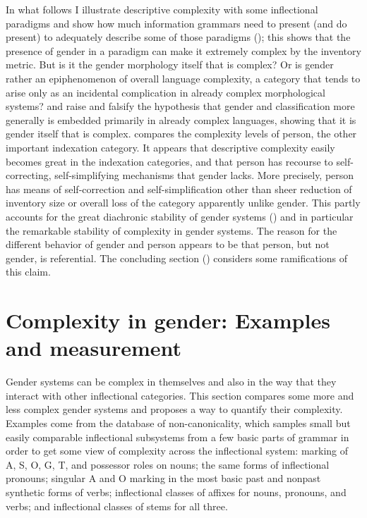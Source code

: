 \documentclass[output=collectionpaper]{langsci/langscibook}
\begin{document}
In what follows I illustrate descriptive complexity with some inflectional para\-digms and show how much information grammars need to present (and do pre\-sent) to adequately describe some of those paradigms (); this shows that the presence of gender in a paradigm can make it extremely complex by the inventory metric. But is it the gender morphology itself that is complex? Or is gender rather an epiphenomenon of overall language complexity, a category that tends to arise only as an incidental complication in already complex morphological systems?  and  raise and falsify the hypothesis that gender \textendash{} and classification more generally \textendash{} is embedded primarily in already complex languages, showing that it is gender itself that is complex.  compares the complexity levels of person, the other important indexation category. It appears that descriptive complexity easily becomes great in the indexation categories, and that person has recourse to self-correcting, self-simplifying mechanisms that gender lacks. More precisely, person has means of self-correction and self-simplification other than sheer reduction of inventory size or overall loss of the category \textendash{} apparently unlike gender. This partly accounts for the great diachronic stability of gender systems (\citealt{Matasovic2014}) and in particular the remarkable stability of complexity in gender systems. The reason for the different behavior of gender and person appears to be that person, but not gender, is referential. The concluding section () considers some ramifications of this claim.

\section{Complexity in gender: Examples and measurement}
\label{sec:Nich:2}

Gender systems can be complex in themselves and also in the way that they interact with other inflectional categories. This section compares some more and less complex gender systems and proposes a way to quantify their complexity. Examples come from the database of non-canonicality, which samples small but easily comparable inflectional subsystems from a few basic parts of grammar in order to get some view of complexity across the inflectional system: marking of A, S, O, G, T, and possessor roles on nouns; the same forms of inflectional pronouns; singular A and O marking in the most basic past and nonpast synthetic forms of verbs; inflectional classes of affixes for nouns, pronouns, and verbs; and inflectional classes of stems for all three.
\end{document}
